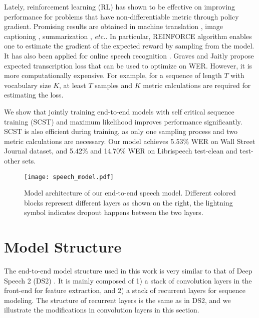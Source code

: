 \documentclass{article}
\newcommand{\etc}{\emph{etc.}\xspace}
\begin{document}
Lately, reinforcement learning (RL) has shown to be effective on improving performance for problems that have non-differentiable metric through policy gradient. Promising results are obtained in machine translation \cite{ranzato2015sequence, bahdanau2016actor}, image captioning \cite{ranzato2015sequence, rennie2016self}, summarization \cite{ranzato2015sequence,paulus2017deep}, \etc.  In particular, REINFORCE algorithm \cite{williams1992simple} enables one to estimate the gradient of the expected reward by sampling from the model. It has also been applied for online speech recognition \cite{luo2017learning}. Graves and Jaitly \cite{graves2014towards} propose expected transcription loss that can be used to optimize on WER. However, it is more computationally expensive. For example, for a sequence of length $T$ with vocabulary size $K$, at least $T$ samples and $K$ metric calculations are required for estimating the loss.


We show that jointly training end-to-end models with self critical sequence training (SCST) \cite{rennie2016self} and maximum likelihood improves performance significantly. 
SCST is also efficient during training, as only one sampling process and two metric calculations are necessary. Our model achieves 5.53\% WER on Wall Street Journal dataset, and 5.42\% and 14.70\% WER on Librispeech test-clean and test-other sets.


\begin{figure}[tbhp!]
\centering
\texttt{[image: speech\_model.pdf]}
\caption{Model architecture of our end-to-end speech model. Different colored blocks represent different layers as shown on the right, the lightning symbol indicates dropout happens between the two layers.}
\label{fig:model_structure}
\end{figure}

\section{Model Structure}
The end-to-end model structure used in this work is very similar to that of Deep Speech 2 (DS2) \cite{amodei2016deep}. It is mainly composed of 1) a stack of convolution layers in the front-end for feature extraction,  and 2) a stack of recurrent layers for sequence modeling. The structure of recurrent layers is the same as in DS2, and we illustrate the modifications in convolution layers in this section. 
\end{document}
